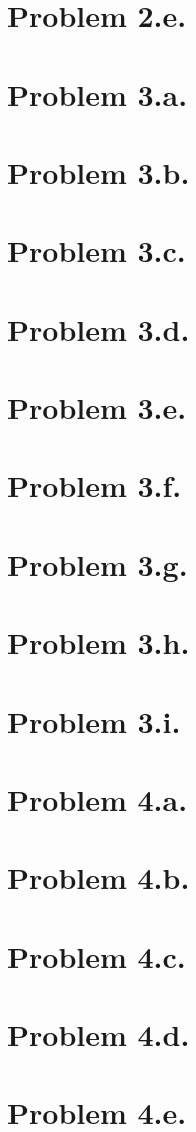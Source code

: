 \documentclass{article}
\begin{document}
\section*{Problem 2.e.}

\section*{Problem 3.a.}
\section*{Problem 3.b.}
\section*{Problem 3.c.}
\section*{Problem 3.d.}
\section*{Problem 3.e.}
\section*{Problem 3.f.}
\section*{Problem 3.g.}
\section*{Problem 3.h.}
\section*{Problem 3.i.}
\section*{Problem 4.a.}
\section*{Problem 4.b.}
\section*{Problem 4.c.}
\section*{Problem 4.d.}
\section*{Problem 4.e.}
\end{document}
